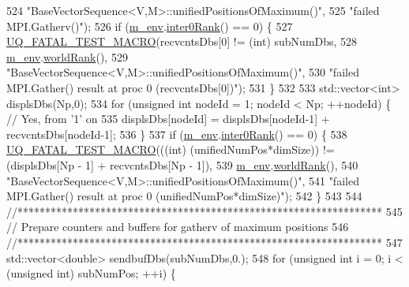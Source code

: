 \begin{DoxyCode}
524                             \textcolor{stringliteral}{"BaseVectorSequence<V,M>::unifiedPositionsOfMaximum()"},
525                             \textcolor{stringliteral}{"failed MPI.Gatherv()"});
526   \textcolor{keywordflow}{if} (\hyperlink{class_q_u_e_s_o_1_1_base_vector_sequence_a8e8824d2a63c5a43bcc6473e3a0491e8}{m\_env}.\hyperlink{class_q_u_e_s_o_1_1_base_environment_ae106b5bb8a80b655b88b3a26b1e7c185}{inter0Rank}() == 0) \{
527     \hyperlink{_defines_8h_a56d63d18d0a6d45757de47fcc06f574d}{UQ\_FATAL\_TEST\_MACRO}(recvcntsDbs[0] != (\textcolor{keywordtype}{int}) subNumDbs,
528                         \hyperlink{class_q_u_e_s_o_1_1_base_vector_sequence_a8e8824d2a63c5a43bcc6473e3a0491e8}{m\_env}.\hyperlink{class_q_u_e_s_o_1_1_base_environment_a78b57112bbd0e6dd0e8afec00b40ffa7}{worldRank}(),
529                         \textcolor{stringliteral}{"BaseVectorSequence<V,M>::unifiedPositionsOfMaximum()"},
530                         \textcolor{stringliteral}{"failed MPI.Gather() result at proc 0 (recvcntsDbs[0])"});
531   \}
532 
533   std::vector<int> displsDbs(Np,0);
534   \textcolor{keywordflow}{for} (\textcolor{keywordtype}{unsigned} \textcolor{keywordtype}{int} nodeId = 1; nodeId < Np; ++nodeId) \{ \textcolor{comment}{// Yes, from '1' on}
535     displsDbs[nodeId] = displsDbs[nodeId-1] + recvcntsDbs[nodeId-1];
536   \}
537   \textcolor{keywordflow}{if} (\hyperlink{class_q_u_e_s_o_1_1_base_vector_sequence_a8e8824d2a63c5a43bcc6473e3a0491e8}{m\_env}.\hyperlink{class_q_u_e_s_o_1_1_base_environment_ae106b5bb8a80b655b88b3a26b1e7c185}{inter0Rank}() == 0) \{
538     \hyperlink{_defines_8h_a56d63d18d0a6d45757de47fcc06f574d}{UQ\_FATAL\_TEST\_MACRO}(((\textcolor{keywordtype}{int}) (unifiedNumPos*dimSize)) != (displsDbs[Np - 1] + 
      recvcntsDbs[Np - 1]),
539                         \hyperlink{class_q_u_e_s_o_1_1_base_vector_sequence_a8e8824d2a63c5a43bcc6473e3a0491e8}{m\_env}.\hyperlink{class_q_u_e_s_o_1_1_base_environment_a78b57112bbd0e6dd0e8afec00b40ffa7}{worldRank}(),
540                         \textcolor{stringliteral}{"BaseVectorSequence<V,M>::unifiedPositionsOfMaximum()"},
541                         \textcolor{stringliteral}{"failed MPI.Gather() result at proc 0 (unifiedNumPos*dimSize)"});
542   \}
543 
544   \textcolor{comment}{//******************************************************************}
545   \textcolor{comment}{// Prepare counters and buffers for gatherv of maximum positions}
546   \textcolor{comment}{//******************************************************************}
547   std::vector<double> sendbufDbs(subNumDbs,0.);
548   \textcolor{keywordflow}{for} (\textcolor{keywordtype}{unsigned} \textcolor{keywordtype}{int} i = 0; i < (\textcolor{keywordtype}{unsigned} int) subNumPos; ++i) \{

\end{DoxyCode}
